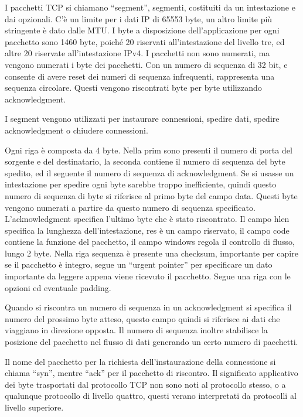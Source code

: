 \documentclass{article}
\numberwithin{equation}{subsection}
\begin{document}
I pacchetti TCP si chiamano ``segment'', segmenti, costituiti da un intestazione e dai opzionali. C'è un limite per i dati IP di 65553 byte, un altro limite più stringente 
è dato dalle MTU. I byte a disposizione dell'applicazione per ogni pacchetto sono 1460 byte, poiché 20 riservati all'intestazione del livello tre, ed altre 20 riservate 
all'intestazione IPv4. 
I pacchetti non sono numerati, ma vengono numerati i byte dei pacchetti. Con un numero di sequenza di 32 bit, e consente di avere reset dei numeri di sequenza 
infrequenti, rappresenta una sequenza circolare. Questi vengono riscontrati byte per byte utilizzando acknowledgment. 

I segment vengono utilizzati per instaurare connessioni, spedire dati, spedire acknowledgment o chiudere connessioni. 


Ogni riga è composta da 4 byte. Nella prim sono presenti il numero di porta del sorgente e del destinatario, la seconda contiene il numero di sequenza del byte spedito, 
ed il seguente il numero di sequenza di acknowledgment. 
Se si usasse un intestazione per spedire ogni byte sarebbe troppo inefficiente, quindi questo numero di sequenza di byte si riferisce al primo byte del campo data. 
Questi byte vengono numerati a partire da questo numero di sequenza specificato. L'acknowledgment specifica l'ultimo byte che è stato riscontrato. 
Il campo hlen specifica la lunghezza dell'intestazione, res è un campo riservato, il campo code contiene la funzione del pacchetto, il campo windows regola il 
controllo di flusso, lungo 2 byte. 
Nella riga sequenza è presente una checksum, importante per capire se il pacchetto è integro, segue un ``urgent pointer'' per specificare un dato importante da 
leggere appena viene ricevuto il pacchetto. Segue una riga con le opzioni ed eventuale padding. 

Quando si riscontra un numero di sequenza in un acknowledgment si specifica il numero del prossimo byte atteso, questo campo quindi si riferisce ai dati che viaggiano 
in direzione opposta. Il numero di sequenza inoltre stabilisce la posizione del pacchetto nel flusso di dati generando un certo numero di pacchetti.  


Il nome del pacchetto per la richiesta dell'instaurazione della connessione si chiama ``syn'', mentre ``ack'' per il pacchetto di riscontro. Il significato applicativo 
dei byte trasportati dal protocollo TCP non sono noti al protocollo stesso, o a qualunque protocollo di livello quattro, questi verano interpretati da protocolli al 
livello superiore. 
\end{document}
